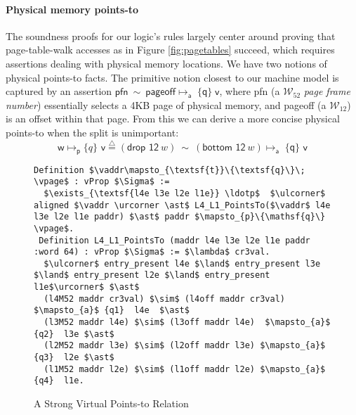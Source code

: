 \paragraph{Physical memory  points-to} The soundness proofs for our logic's rules largely center around 
proving that page-table-walk accesses as in Figure \ref{fig:pagetables} succeed, which requires assertions
dealing with physical memory locations.
We have two notions of physical points-to facts. The primitive notion closest to our machine model is captured by an assertion
$ \textsf{pfn} \ \sim \ \textsf{pageoff} \mapsto_{\textsf{a}} \; \{\textsf{q}\} \; \textsf{v} $, where \textsf{pfn} (a $\mathcal{W}_{52}$ \emph{page frame number}) essentially selects a 4KB page of physical memory,
and \textsf{pageoff} (a $\mathcal{W}_{12}$) is an offset within that page.
From this we can derive a more concise physical points-to when the split is unimportant:
\[\textsf{w} \mapsto_{\textsf{p}} \{q\} \textsf{ v} \stackrel{\triangle}{=} (\textsf{drop 12}~w) \ \sim \ (\textsf{bottom 12}~w)\mapsto_{\textsf{a}} \; \{\textsf{q}\} \textsf{ v} \]

\begin{figure*}
  \begin{lstlisting}[language=Coq]
 Definition $\vaddr\mapsto_{\textsf{t}}\{\textsf{q}\}\; \vpage$ : vProp $\Sigma$ := 
  $\exists_{\textsf{l4e l3e l2e l1e}} \ldotp$  $\ulcorner$ aligned $\vaddr \urcorner \ast$ L4_L1_PointsTo($\vaddr$ l4e l3e l2e l1e paddr) $\ast$ paddr $\mapsto_{p}\{\mathsf{q}\} \vpage$.
 Definition L4_L1_PointsTo (maddr l4e l3e l2e l1e paddr :word 64) : vProp $\Sigma$ := $\lambda$ cr3val.
  $\ulcorner$ entry_present l4e $\land$ entry_present l3e $\land$ entry_present l2e $\land$ entry_present l1e$\urcorner$ $\ast$
  (l4M52 maddr cr3val) $\sim$ (l4off maddr cr3val) $\mapsto_{a}$ {q1}  l4e  $\ast$
  (l3M52 maddr l4e) $\sim$ (l3off maddr l4e)  $\mapsto_{a}$ {q2}  l3e $\ast$ 
  (l2M52 maddr l3e) $\sim$ (l2off maddr l3e) $\mapsto_{a}$ {q3}  l2e $\ast$
  (l1M52 maddr l2e) $\sim$ (l1off maddr l2e) $\mapsto_{a}$ {q4}  l1e.
\end{lstlisting}
\vspace{-1em}
\caption{A Strong Virtual Points-to Relation}
  \label{fig:strongvirtualpointsto}
\end{figure*}



